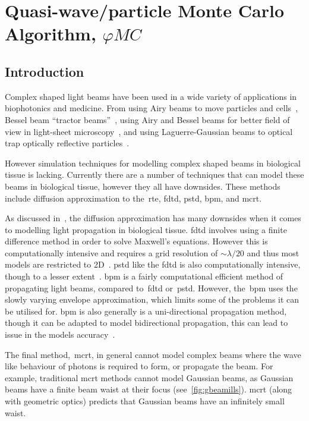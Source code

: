 \chapter{Quasi-wave/particle Monte Carlo Algorithm, \texorpdfstring{$\varphi MC$}{phiMC}}\label{sec:phase}

\section{Introduction}\label{sec:besintro}

Complex shaped light beams have been used in a wide variety of applications in biophotonics and medicine.
From using Airy beams to move particles and cells~\cite{baumgartl2008optically}, Bessel beam ``tractor beams''~\cite{ruffner2012optical}, using Airy and Bessel beams for better field of view in light-sheet microscopy~\cite{vettenburg2014light}, and using Laguerre-Gaussian beams to optical trap optically reflective particles~\cite{simpson1996optical}.


However simulation techniques for modelling complex shaped beams in biological tissue is lacking.
Currently there are a number of techniques that can model these beams in biological tissue, however they all have downsides.
These methods include diffusion approximation to the~\gls*{rte}, \gls*{fdtd}, \gls*{pstd}, \gls*{bpm}, and \gls*{mcrt}.

As discussed in~, the diffusion approximation has many downsides when it comes to modelling light propagation in biological tissue.
\gls*{fdtd} involves using a finite difference method in order to solve Maxwell's equations.
However this is computationally intensive and requires a grid resolution of $\sim \lambda/20$ and thus most models are restricted to 2D~\cite{glaser2016fractal,elmaklizi2015penetration}. 
\gls*{pstd} like the \gls*{fdtd} is also computationally intensive, though to a lesser extent~\cite{glaser2016fractal}.
\gls*{bpm} is a fairly computational efficient method of propagating light beams, compared to~\gls*{fdtd} or~\gls*{pstd}.
However, the~\gls*{bpm} uses the slowly varying envelope approximation, which limits some of the problems it can be utilised for.
\Gls*{bpm} is also generally is a uni-directional propagation method, though it can be adapted to model bidirectional propagation, this can lead to issue in the models accuracy~\cite{van1981beam,glaser2016fractal}.

\medskip

The final method,~\gls*{mcrt}, in general cannot model complex beams where the wave like behaviour of photons is required to form, or propagate the beam.
For example, traditional \gls*{mcrt} methods cannot model Gaussian beams, as Gaussian beams have a finite beam waist at their focus (see~\cref{fig:gbeamills}).
\Gls*{mcrt} (along with geometric optics) predicts that Gaussian beams have an infinitely small waist.

